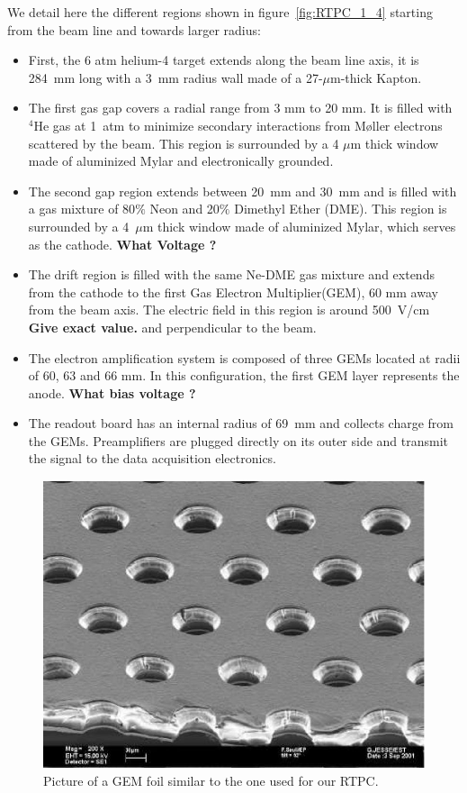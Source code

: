 \documentclass[twocolumn,showpacs,superscriptaddress,groupedaddress]{revtex4}
\begin{document}
We detail here the different regions shown in figure~\ref{fig:RTPC_1_4} starting 
from the beam line and towards larger radius:\\
\begin{itemize}
   \item First, the 6 atm helium-4 target extends along the beam line axis, it 
      is 284~mm long with a 3~mm radius wall made of a 27-$\mu$m-thick Kapton.
   \item The first gas gap covers a radial range from 3 mm to 20 mm. It is 
      filled with $^{4}$He gas at 1~atm to minimize secondary interactions from
      M\o ller electrons scattered by the beam. This 
      region is surrounded by a 4 $\mu$m thick window made of aluminized Mylar 
      and electronically grounded.
   \item The second gap region extends between 20~mm and 30~mm and is filled with a 
      gas mixture of 80$\%$ Neon and 20$\%$ Dimethyl Ether (DME). This region 
      is surrounded by a 4~$\mu$m thick window made of aluminized Mylar, which 
      serves as the cathode. {\bf \color{red} What Voltage ?}
   \item The drift region is filled with the same Ne-DME gas mixture and extends 
      from the cathode to the first Gas Electron Multiplier(GEM), 60 mm away 
      from the beam axis. The electric field in this region is around 500~V/cm 
      {\bf \color{red} Give exact value.} and perpendicular to the beam.
   \item The electron amplification system is composed of three GEMs located at 
      radii of 60, 63 and 66 mm. In this configuration, the first GEM layer 
      represents the anode. {\bf \color{red} What bias voltage ?}
   \item The readout board has an internal radius of 69~mm and collects charge
     from the GEMs. Preamplifiers are plugged directly on its outer side and
     transmit the signal to the data acquisition electronics.
\end{itemize}

\begin{figure}[tbp]
\centering
\includegraphics[scale=0.70]{fig/GEM_photo.jpg}
\caption{Picture of a GEM foil similar to the one used for our RTPC.} 
\label{fig:GEMs}
\end{figure}
\end{document}
